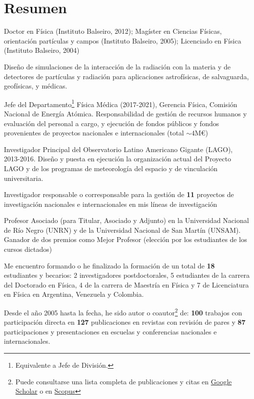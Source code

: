 \documentclass[11pt, a4paper]{article}
\renewenvironment{itemize}{
  \begin{list}{}{
    \setlength{\leftmargin}{0em}
    \setlength{\itemsep}{0.25em}
    \setlength{\parskip}{0pt}
    \setlength{\parsep}{.250em}
  }
}{
  \end{list}
}
\begin{document}
  \section*{Resumen}\label{sec:resumen}
  \begin{description}
    \item[Formación:] Doctor en Física (Instituto Balseiro, 2012); Magíster en Ciencias Físicas, orientación partículas y campos (Instituto Balseiro, 2005); Licenciado en Física (Instituto Balseiro, 2004)
    \item[Línea de investigación:] Diseño de simulaciones de la interacción de la radiación con la materia y de detectores de partículas y radiación para aplicaciones astrofísicas, de salvaguarda, geofísicas, y médicas.
    \item[Gestión institucional:]
    \begin{itemize}
        \item Jefe del Departamento\footnote{Equivalente a Jefe de División.} Física Médica (2017-2021), Gerencia Física, Comisión Nacional de Energía Atómica.
        Responsabilidad de gestión de recursos humanos y evaluación del personal a cargo, y ejecución de fondos públicos y fondos provenientes de proyectos nacionales e internacionales (total $\sim 4$M€)
        \item Investigador Principal del Observatorio Latino Americano Gigante (LAGO), 2013-2016.
        Diseño y puesta en ejecución la organización actual del Proyecto LAGO y de los programas de meteorología del espacio y de vinculación universitaria.
    \end{itemize}
    \item[Gestión de proyectos:] Investigador responsable o corresponsable para la gestión de {\textbf{11}} proyectos de investigación nacionales e internacionales en mis líneas de investigación
    \item[Docencia:] Profesor Asociado (para Titular, Asociado y Adjunto) en la Universidad Nacional de Río Negro (UNRN) y de la Universidad Nacional de San Martín (UNSAM).
    Ganador de dos premios como Mejor Profesor (elección por los estudiantes de los cursos dictados)
    \item[Formación de recursos humanos:] Me encuentro formando o he finalizado la formación de un total de {\textbf{18}} estudiantes y becarios: 2 investigadores postdoctorales, 5 estudiantes de la carrera del Doctorado en Física, 4 de la carrera de Maestría en Física y 7 de Licenciatura en Física en Argentina, Venezuela y Colombia.
    \item[Producción científica] Desde el año 2005 hasta la fecha, he sido autor o coautor\footnote{Puede consultarse una lista completa de publicaciones y citas en \href{https://scholar.google.com/citations?user=Vj7_fGsAAAAJ}{Google Scholar} o en \href{https://www.scopus.com/authid/detail.url?authorId=35276880300}{Scopus}} de: {\textbf{100}} trabajos con participación directa en {\textbf{127}} publicaciones en revistas con revisión de pares y {\textbf{87}} participaciones y presentaciones en escuelas y conferencias nacionales e internacionales.

\end{description}
\end{document}
